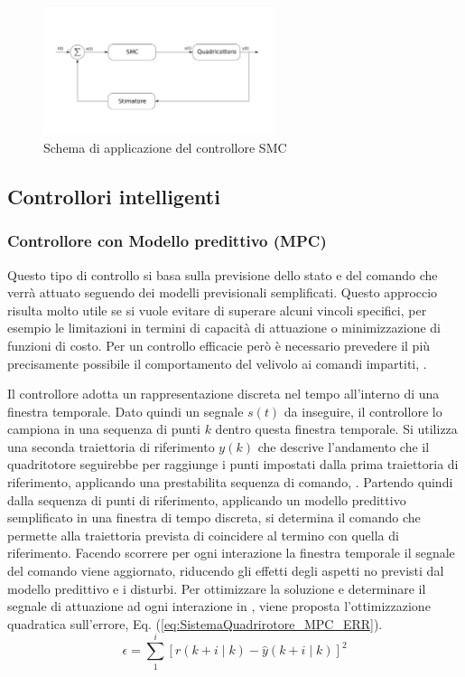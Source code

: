 \begin{figure}
	\centering
	\includegraphics[width=0.6\textwidth]{SistemaQuadrirotore/Figure/SMC}
	\caption{Schema di applicazione del controllore SMC}
\end{figure}

\subsection{Controllori intelligenti}

\subsubsection{Controllore con Modello predittivo (MPC)}

Questo tipo di controllo si basa sulla previsione dello stato e del comando che verrà attuato seguendo dei modelli previsionali semplificati. Questo approccio risulta molto utile se si vuole evitare di superare alcuni vincoli specifici, per esempio le limitazioni in termini di capacità di attuazione o minimizzazione di funzioni di costo. Per un controllo efficacie però è necessario prevedere il più precisamente possibile il comportamento del velivolo ai comandi impartiti, \cite{KimJinho2020ACSo}.

Il controllore adotta un rappresentazione discreta nel tempo all'interno di una finestra temporale. Dato quindi un segnale $s(t)$ da inseguire, il controllore lo campiona in una sequenza di punti $k$ dentro questa finestra temporale. Si utilizza una seconda traiettoria di riferimento $y(k)$ che descrive l'andamento che il quadritotore seguirebbe per raggiunge i punti impostati dalla prima traiettoria di riferimento, applicando una prestabilita sequenza di comando, \cite{AbdolhosseiniM2013AEMP}. 
Partendo quindi dalla sequenza di punti di riferimento, applicando un modello predittivo semplificato in una finestra di tempo discreta, si determina il comando che permette alla traiettoria prevista di coincidere al termino con quella di riferimento. Facendo scorrere per ogni interazione la finestra temporale il segnale del comando viene aggiornato, riducendo gli effetti degli aspetti no previsti dal modello predittivo e i disturbi.
Per ottimizzare la soluzione e determinare il segnale di attuazione ad ogni interazione in \cite{AbdolhosseiniM2013AEMP}, viene proposta l'ottimizzazione quadratica sull'errore, Eq. (\ref{eq:SistemaQuadrirotore_MPC_ERR}).
\begin{equation}\label{eq:SistemaQuadrirotore_MPC_ERR}
	\epsilon = \sum_{1}^{i} \left[r(k+i \mid k) - \hat{y}(k+i \mid k)\right]^2
\end{equation}

